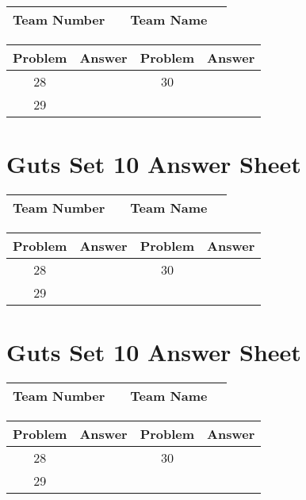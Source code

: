 \documentclass[14pt]{article}
\begin{document}
\begin{center}
\begin{tabular}{|r|r|r|r|}
\hline
	Team Number & \hspace{10em} &
	Team Name & \hspace{15em} \\ \hline
\end{tabular}
\end{center}
\begin{tabularx}{\textwidth}{|c|l|c|X|}\hline
	Problem & Answer & Problem & Answer \\\hline
	28 & \hspace{15em} & 30 & \\\hline
	29 & & & \\\hline
\end{tabularx}

\vspace{30px}

\section*{Guts Set 10 Answer Sheet}

\begin{center}
\begin{tabular}{|r|r|r|r|}
\hline
	Team Number & \hspace{10em} &
	Team Name & \hspace{15em} \\ \hline
\end{tabular}
\end{center}
\begin{tabularx}{\textwidth}{|c|l|c|X|}\hline
	Problem & Answer & Problem & Answer \\\hline
	28 & \hspace{15em} & 30 & \\\hline
	29 & & & \\\hline
\end{tabularx}

\vspace{30px}

\section*{Guts Set 10 Answer Sheet}

\begin{center}
\begin{tabular}{|r|r|r|r|}
\hline
	Team Number & \hspace{10em} &
	Team Name & \hspace{15em} \\ \hline
\end{tabular}
\end{center}
\begin{tabularx}{\textwidth}{|c|l|c|X|}\hline
	Problem & Answer & Problem & Answer \\\hline
	28 & \hspace{15em} & 30 & \\\hline
	29 & & & \\\hline
\end{tabularx}
\end{document}
